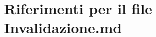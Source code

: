 \hypertarget{Invalidazione_8md}{}\section{Riferimenti per il file Invalidazione.\+md}
\label{Invalidazione_8md}
